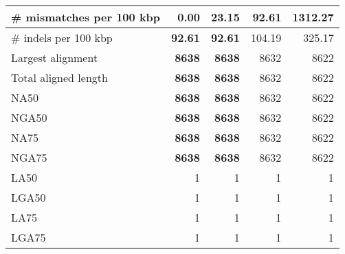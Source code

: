 \documentclass[12pt,a4paper]{article}
\begin{document}
\begin{table}[ht]
\begin{center}
\begin{tabular}{|l*{4}{|r}|}
\# mismatches per 100 kbp & {\bf 0.00} & 23.15 & 92.61 & 1312.27 \\ \hline
\# indels per 100 kbp & {\bf 92.61} & {\bf 92.61} & 104.19 & 325.17 \\ \hline
Largest alignment & {\bf 8638} & {\bf 8638} & 8632 & 8622 \\ \hline
Total aligned length & {\bf 8638} & {\bf 8638} & 8632 & 8622 \\ \hline
NA50 & {\bf 8638} & {\bf 8638} & 8632 & 8622 \\ \hline
NGA50 & {\bf 8638} & {\bf 8638} & 8632 & 8622 \\ \hline
NA75 & {\bf 8638} & {\bf 8638} & 8632 & 8622 \\ \hline
NGA75 & {\bf 8638} & {\bf 8638} & 8632 & 8622 \\ \hline
LA50 & 1 & 1 & 1 & 1 \\ \hline
LGA50 & 1 & 1 & 1 & 1 \\ \hline
LA75 & 1 & 1 & 1 & 1 \\ \hline
LGA75 & 1 & 1 & 1 & 1 \\ \hline
\end{tabular}
\end{center}
\end{table}
\end{document}
